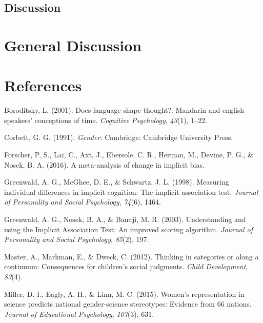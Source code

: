 \documentclass[man]{apa6}
\theoremstyle{definition}
\theoremstyle{definition}
\theoremstyle{definition}
\theoremstyle{remark}
\begin{document}
\subsection{Discussion}\label{discussion-4}

\section{General Discussion}\label{general-discussion}

\newpage

\section{References}\label{references}

\begingroup
\setlength{\parindent}{-0.5in} \setlength{\leftskip}{0.5in}

\hypertarget{refs}{}
\hypertarget{ref-boroditsky2001does}{}
Boroditsky, L. (2001). Does language shape thought?: Mandarin and
english speakers' conceptions of time. \emph{Cognitive Psychology},
\emph{43}(1), 1--22.

\hypertarget{ref-corbett1991}{}
Corbett, G. G. (1991). \emph{Gender}. Cambridge: Cambridge University
Press.

\hypertarget{ref-forscher2016meta}{}
Forscher, P. S., Lai, C., Axt, J., Ebersole, C. R., Herman, M., Devine,
P. G., \& Nosek, B. A. (2016). A meta-analysis of change in implicit
bias.

\hypertarget{ref-greenwald1998measuring}{}
Greenwald, A. G., McGhee, D. E., \& Schwartz, J. L. (1998). Measuring
individual differences in implicit cognition: The implicit association
test. \emph{Journal of Personality and Social Psychology}, \emph{74}(6),
1464.

\hypertarget{ref-greenwald2003understanding}{}
Greenwald, A. G., Nosek, B. A., \& Banaji, M. R. (2003). Understanding
and using the Implicit Association Test: An improved scoring algorithm.
\emph{Journal of Personality and Social Psychology}, \emph{85}(2), 197.

\hypertarget{ref-master2012thinking}{}
Master, A., Markman, E., \& Dweck, C. (2012). Thinking in categories or
along a continuum: Consequences for children's social judgments.
\emph{Child Development}, \emph{83}(4).

\hypertarget{ref-miller2015women}{}
Miller, D. I., Eagly, A. H., \& Linn, M. C. (2015). Women's
representation in science predicts national gender-science stereotypes:
Evidence from 66 nations. \emph{Journal of Educational Psychology},
\emph{107}(3), 631.
\end{document}
